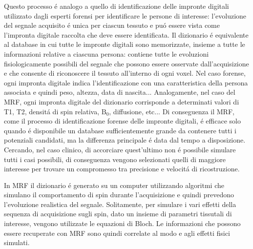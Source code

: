 \documentclass[a4paper,12pt]{report}
\begin{document}
 Questo processo \'e analogo a quello di identificazione delle impronte digitali utilizzato dagli esperti forensi per identificare le persone di interesse: l'evoluzione del segnale acquisito \'e unica per ciascun tessuto e pu\'o essere vista come l'impronta digitale raccolta che deve essere identificata. 
 Il dizionario \'e equivalente al database in cui tutte le impronte digitali sono memorizzate, insieme a tutte le informazioni relative a ciascuna persona: contiene tutte le evoluzioni fisiologicamente possibili del segnale che possono essere osservate dall'acquisizione e che consente di riconoscere il tessuto all'interno di ogni voxel. 
 Nel caso forense, ogni impronta digitale indica l'identificazione con una caratteristica della persona associata e quindi peso, altezza, data di nascita... 
 Analogamente, nel caso del MRF, ogni impronta digitale del dizionario corrisponde a determinati valori di T1, T2, densit\'a di spin relativa, $\mbox{B}_0$, diffusione, etc... 
 Di conseguenza il MRF, come il processo di identificazione forense delle impronte digitali, \'e efficace solo quando \'e disponibile un database sufficientemente grande da contenere tutti i potenziali candidati, ma la differenza principale \'e data dal tempo a disposizione. 
 Cercando, nel caso clinico, di accorciare quest'ultimo non \'e possibile simulare tutti i casi possibili, di conseguenza vengono selezionati quelli di maggiore interesse per trovare un compromesso tra precisione e velocit\'a di ricostruzione. 
 
 In MRF il dizionario \'e generato su un computer utilizzando algoritmi che simulano il comportamento di spin durante l'acquisizione e quindi prevedono l'evoluzione realistica del segnale. 
 Solitamente, per simulare i vari effetti della sequenza di acquisizione sugli spin, dato un insieme di parametri tissutali di interesse, vengono utilizzate le equazioni di Bloch. 
 Le informazioni che possono essere recuperate con MRF sono quindi correlate al modo e agli effetti fisici simulati. 
 
\end{document}
